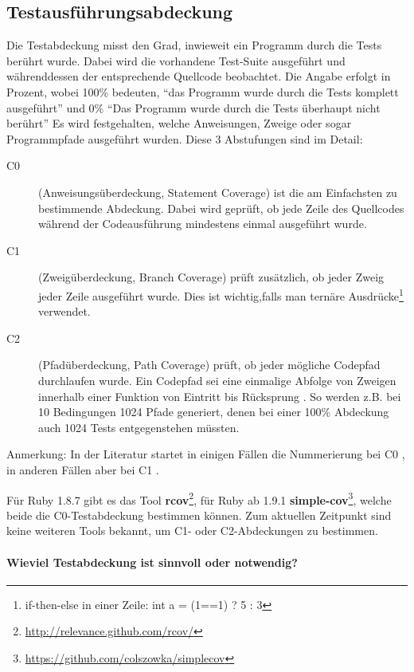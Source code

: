 \subsection{Testausführungsabdeckung}
\label{sec:coverage}
Die Testabdeckung misst den Grad, inwieweit ein Programm durch die Tests berührt wurde. Dabei wird die vorhandene Test-Suite ausgeführt und währenddessen der entsprechende Quellcode beobachtet. Die Angabe erfolgt in Prozent, wobei 100\% bedeuten, "`das Programm wurde durch die Tests komplett ausgeführt"' und 0\% "`Das Programm wurde durch die Tests überhaupt nicht berührt"'  Es wird festgehalten, welche Anweisungen, Zweige oder sogar Programmpfade ausgeführt wurden. Diese 3 Abstufungen sind im Detail:
\begin{description}
 \item[C0] (Anweisungsüberdeckung, Statement Coverage) ist die am Einfachsten zu bestimmende Abdeckung. Dabei wird geprüft, ob jede Zeile des Quellcodes während der Codeausführung mindestens einmal ausgeführt wurde.
 \item[C1] (Zweigüberdeckung, Branch Coverage) prüft zusätzlich, ob jeder Zweig jeder Zeile ausgeführt wurde. Dies ist wichtig,falls man ternäre Ausdrücke\footnote{if-then-else in einer Zeile: int a = (1==1) ? 5 : 3} verwendet.
 \item[C2] (Pfadüberdeckung, Path Coverage) prüft, ob jeder mögliche Codepfad durchlaufen wurde. Ein Codepfad sei eine einmalige Abfolge von Zweigen innerhalb einer Funktion von Eintritt bis Rücksprung \citep{steve_cornett_code_1996}. So werden z.B. bei 10 Bedingungen 1024 Pfade generiert, denen bei einer 100\% Abdeckung auch 1024 Tests entgegenstehen müssten.
 \end{description}
 Anmerkung: In der Literatur startet in einigen Fällen die Nummerierung bei C0 \citep{catherine_powell_abakas_2008}, in anderen Fällen aber bei C1 \citep{steve_cornett_code_1996}.

 Für Ruby 1.8.7 gibt es das Tool \textbf{rcov}\footnote{\url{http://relevance.github.com/rcov/}}, für Ruby ab 1.9.1 \textbf{simple-cov}\footnote{\url{https://github.com/colszowka/simplecov}}, welche beide die C0-Testabdeckung bestimmen können. Zum aktuellen Zeitpunkt sind keine weiteren Tools bekannt, um C1- oder C2-Abdeckungen zu bestimmen.
 \paragraph{Wieviel Testabdeckung ist sinnvoll oder notwendig?}

